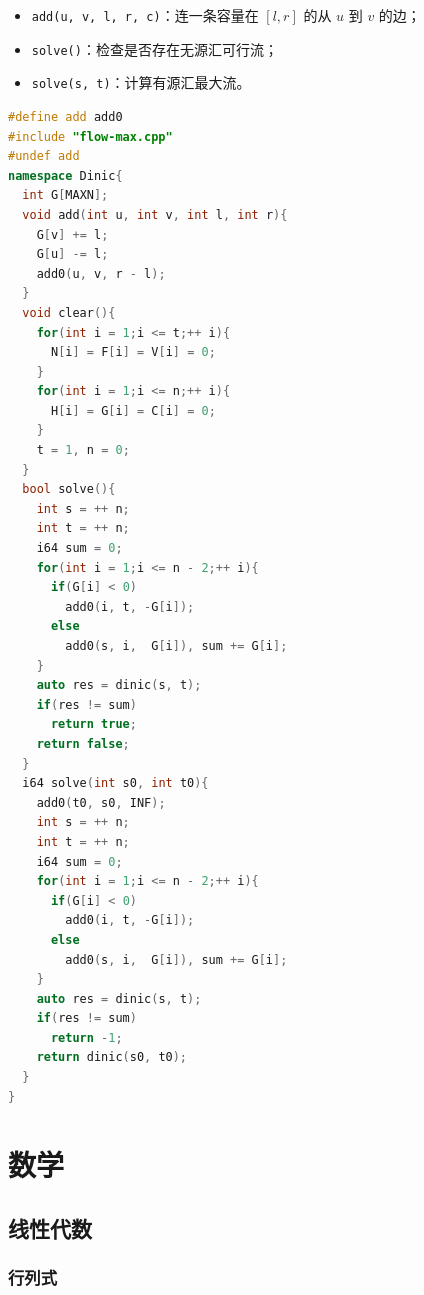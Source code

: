 \documentclass[10pt]{ctexart}
\providecommand{\tightlist}{\setlength{\itemsep}{0pt}\setlength{\parskip}{0pt}}
\newcommand{\passthrough}[1]{#1}
\begin{document}
\begin{multicols}{3}
    \begin{itemize}
    \tightlist
    \item
      \passthrough{\lstinline!add(u, v, l, r, c)!}：连一条容量在
      \([l, r]\) 的从 \(u\) 到 \(v\) 的边；
    \item
      \passthrough{\lstinline!solve()!}：检查是否存在无源汇可行流；
    \item
      \passthrough{\lstinline!solve(s, t)!}：计算有源汇最大流。
    \end{itemize}

\begin{lstlisting}[language={C++}]
#define add add0
#include "flow-max.cpp"
#undef add
namespace Dinic{
  int G[MAXN];
  void add(int u, int v, int l, int r){
    G[v] += l;
    G[u] -= l;
    add0(u, v, r - l);
  }
  void clear(){
    for(int i = 1;i <= t;++ i){
      N[i] = F[i] = V[i] = 0;
    }
    for(int i = 1;i <= n;++ i){
      H[i] = G[i] = C[i] = 0;
    }
    t = 1, n = 0;
  }
  bool solve(){
    int s = ++ n;
    int t = ++ n;
    i64 sum = 0;
    for(int i = 1;i <= n - 2;++ i){
      if(G[i] < 0)
        add0(i, t, -G[i]);
      else
        add0(s, i,  G[i]), sum += G[i];
    }
    auto res = dinic(s, t);
    if(res != sum)
      return true;
    return false;
  }
  i64 solve(int s0, int t0){
    add0(t0, s0, INF);
    int s = ++ n;
    int t = ++ n;
    i64 sum = 0;
    for(int i = 1;i <= n - 2;++ i){
      if(G[i] < 0)
        add0(i, t, -G[i]);
      else
        add0(s, i,  G[i]), sum += G[i];
    }
    auto res = dinic(s, t);
    if(res != sum)
      return -1;
    return dinic(s0, t0);
  }
}
\end{lstlisting}

    \section{数学}\label{ux6570ux5b66}

    \subsection{线性代数}\label{ux7ebfux6027ux4ee3ux6570}

    \subsubsection{行列式}\label{ux884cux5217ux5f0f}


\end{multicols}
\end{document}
